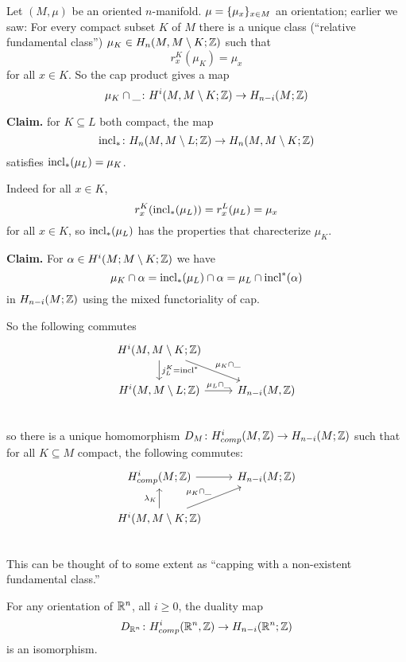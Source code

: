 \documentclass[language=english]{TemplateLecture}
\begin{document}
\begin{construction}
    Let \((M, \mu)\) be an oriented \(n\)-manifold. \(\mu = \{\mu_x\}_{x \in M}\) an orientation; earlier we saw: For every compact subset \(K\) of \(M\) there is a unique class (\enquote{relative fundamental class}) \(\mu_K \in H_n(M, M\setminus K; \mathbb{Z})\) such that
    \[r_x^K(\mu_K) = \mu_x\]
    for all \(x \in K\). So the cap product gives a map
    \[\mu_K \cap \_\colon H^i(M, M \setminus K; \mathbb{Z}) \to H_{n-i}(M; \mathbb{Z})\]

    \textbf{Claim.} for \(K \subseteq L\) both compact, the map
    \[\operatorname{incl}_*\colon H_n(M, M\setminus L; \mathbb{Z}) \to H_n(M, M\setminus K; \mathbb{Z})\]
    satisfies \(\operatorname{incl}_*(\mu_L) = \mu_K\).

    Indeed for all \(x \in K\),
    \[r_x^K(\operatorname{incl}_*(\mu_L)) = r_x^L(\mu_L) = \mu_x\]
    for all \(x \in K\), so \(\operatorname{incl}_*(\mu_L)\) has the properties that charecterize \(\mu_K\).

    \textbf{Claim.} For \(\alpha\in H^i(M; M\setminus K; \mathbb{Z})\) we have
    \[\mu_K \cap \alpha = \operatorname{incl}_*(\mu_L) \cap \alpha = \mu_L\cap \operatorname{incl}^*(\alpha) \]
    in \(H_{n-i}(M; \mathbb{Z})\) using the mixed functoriality of cap.

    So the following commutes
    \[\begin{tikzcd}
        H^i(M, M\setminus K; \IZ) \ar[rd, "\mu_K \cap \_"] \ar[d, "j_L^K = \incl^*"] & \\
        H^i(M, M\setminus L; \IZ) \ar[r, "\mu_L \cap \_"] & H_{n-i}(M, \IZ)\\
    \end{tikzcd}\]
    so there is a unique homomorphism \(D_M\colon H^i_{comp}(M, \mathbb{Z}) \to H_{n-i}(M; \mathbb{Z})\) such that for all \(K \subseteq M\) compact, the following commutes:
    \[\begin{tikzcd}
        H_{comp}^i(M; \IZ) \ar[r] & H_{n-i}(M; \IZ) \\
        H^i(M, M\setminus K; \IZ) \ar[u, "\lambda_K"] \ar[ru, "\mu_K \cap \_"] & \\
    \end{tikzcd}\]
    This can be thought of to some extent as \enquote{capping with a non-existent fundamental class.}
\end{construction}

\begin{proposition}
    For any orientation of \(\mathbb{R}^n\), all \(i \geq 0\), the duality map
    \[D_{\mathbb{R}^n}\colon H_{comp}^i(\mathbb{R}^n, \mathbb{Z}) \to H_{n-i}(\mathbb{R}^n; \mathbb{Z})\]
    is an isomorphism.
\end{proposition}
\end{document}
